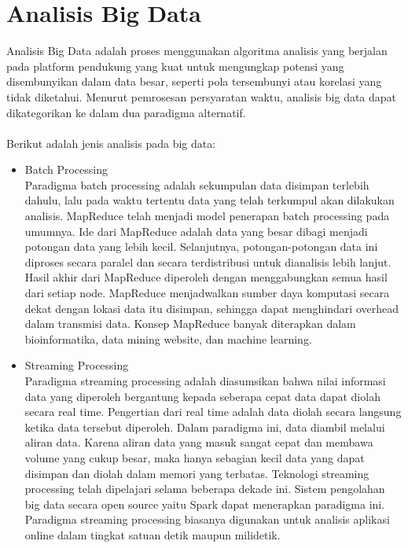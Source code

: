 \section{Analisis Big Data}
Analisis Big Data adalah proses menggunakan algoritma analisis yang berjalan pada platform pendukung yang kuat untuk mengungkap potensi yang disembunyikan dalam data besar, seperti pola tersembunyi atau korelasi yang tidak diketahui. Menurut
pemrosesan persyaratan waktu, analisis big data dapat dikategorikan ke dalam dua paradigma alternatif.
\\\\
Berikut adalah jenis analisis pada big data:
\begin{itemize}
\item 
Batch Processing\\
Paradigma batch processing adalah sekumpulan data disimpan terlebih dahulu, lalu pada waktu tertentu data yang telah terkumpul akan dilakukan analisis. MapReduce telah menjadi model penerapan batch processing pada umumnya. Ide dari MapReduce adalah  data yang besar dibagi menjadi potongan data yang lebih kecil. Selanjutnya, potongan-potongan data ini diproses secara paralel dan secara terdistribusi untuk dianalisis lebih lanjut. Hasil akhir dari MapReduce diperoleh dengan menggabungkan semua hasil dari setiap node. MapReduce menjadwalkan sumber daya komputasi secara dekat dengan lokasi data itu disimpan, sehingga dapat menghindari overhead dalam transmisi data. Konsep MapReduce banyak diterapkan dalam bioinformatika, data mining website, dan machine learning.

\item
Streaming Processing\\
Paradigma streaming processing adalah diasumsikan bahwa nilai informasi data yang diperoleh bergantung kepada seberapa cepat data dapat diolah secara real time. Pengertian dari real time adalah data diolah secara langsung ketika data tersebut diperoleh. Dalam paradigma ini, data diambil melalui aliran data. Karena aliran data yang masuk sangat cepat dan membawa volume yang cukup besar, maka hanya sebagian kecil data yang dapat disimpan dan diolah dalam memori yang terbatas. Teknologi streaming processing telah dipelajari selama beberapa dekade ini. Sistem pengolahan big data secara open source yaitu Spark dapat menerapkan paradigma ini. Paradigma streaming processing biasanya digunakan untuk analisis aplikasi online dalam tingkat satuan detik maupun milidetik.
\end{itemize}

